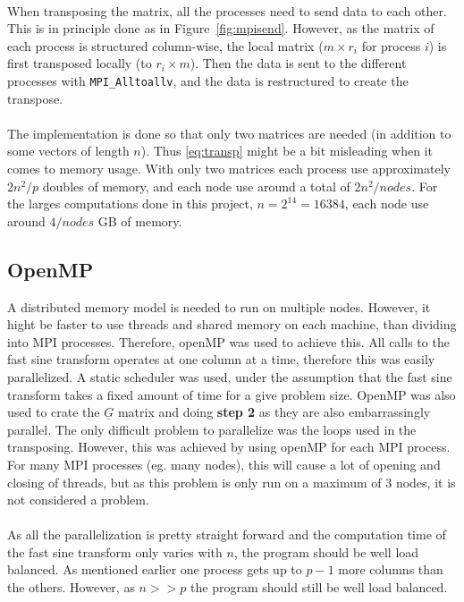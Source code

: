 \\
When transposing the matrix, all the processes need to send data to each other. This is in principle done as in Figure~\ref{fig:mpisend}. However, as the matrix of each process is structured column-wise, the local matrix ($m \times r_i$ for process $i$) is first transposed locally (to $r_i \times m$). Then the data is sent to the different processes with \verb+MPI_Alltoallv+, and the data is restructured to create the transpose. \\
\\
The implementation is done so that only two matrices are needed (in addition to some vectors of length $n$). Thus \ref{eq:transp} might be a bit misleading when it comes to memory usage. With only two matrices each process use approximately $2 n^2/p$ doubles of memory, and each node use around a total of $2 n^2/nodes$. For the larges computations done in this project, $n = 2^{14} = 16384$, each node use around $4/nodes$ GB of memory.
%
\subsection{OpenMP}
\label{sub:OpenMP}
A distributed memory model is needed to run on multiple nodes. However, it hight be faster to use threads and shared memory on each machine, than dividing into MPI processes. Therefore, openMP was used to achieve this. 
All calls to the fast sine transform operates at one column at a time, therefore this was easily parallelized. A static scheduler was used, under the assumption that the fast sine transform takes a fixed amount of time for a give problem size. OpenMP was also used to crate the $\underline{G}$ matrix and doing \textbf{step 2} as they are also embarrassingly parallel. The only difficult problem to parallelize was the loops used in the transposing. However, this was achieved by using openMP for each MPI process. For many MPI processes (eg. many nodes), this will cause a lot of opening and closing of threads, but as this problem is only run on a maximum of 3 nodes, it is not considered a problem. \\
\\
As all the parallelization is pretty straight forward and the computation time of the fast sine transform only varies with $n$, the program should be well load balanced. As mentioned earlier one process gets up to $p-1$ more columns than the others. However, as $n >> p$ the program should still be well load balanced.
%
%

